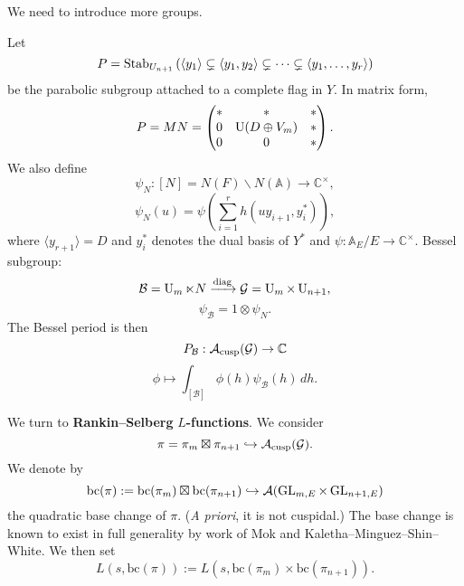 \documentclass[reqno]{amsart} 
\begin{document}
We need to introduce more groups.

Let
\begin{equation*}
  P = \operatorname{Stab}_{U_{n+1} } \left( \langle y_1  \rangle \subsetneq \langle y_1, y_2  \rangle \subsetneq \dotsb \subsetneq \langle y_{1}, \dotsc, y_r  \rangle  \right)
\end{equation*}
be the parabolic subgroup attached to a complete flag in $Y$.  In matrix form,
\begin{equation*}
  P = M N
  =
\begin{pmatrix}
\ast & \ast & \ast \\
0 & \operatorname{U} (D \oplus V_m ) & \ast \\
0 & 0 & \ast \\
\end{pmatrix}.
\end{equation*}
We also define
\begin{equation*}
\psi_N : [N] = N(F) \backslash N (\mathbb{A} ) \rightarrow \mathbb{C}^\times ,
\end{equation*}
\begin{equation*}
\psi_N (u) = \psi \left( \sum_{i = 1}^r h (u y_{i + 1}, y_i^\ast) \right),
\end{equation*}
where $\langle y_{r + 1} \rangle = D$ and $y_i^\ast$ denotes the dual basis of $Y^\ast$ and $\psi : \mathbb{A}_E / E \rightarrow \mathbb{C}^\times$.  Bessel subgroup:
\begin{equation*}
\mathcal{B} = \operatorname{U}_m \ltimes N \xrightarrow{\mathrm{diag}} \mathcal{G} = \operatorname{U}_m \times \operatorname{U}_{n + 1},
\end{equation*}
\begin{equation*}
\psi_{\mathcal{B} } = 1 \otimes \psi_N.
\end{equation*}
The Bessel period is then
\begin{equation*}
P_{\mathcal{B} } : \mathcal{A}_{\operatorname{cusp}} (\mathcal{G} ) \rightarrow \mathbb{C}
\end{equation*}
\begin{equation*}
\phi \mapsto \int_{[\mathcal{B} ]} \phi (h) \psi_{\mathcal{B} } (h) \, d h.
\end{equation*}

We turn to \textbf{Rankin--Selberg} $L$\textbf{-functions}.  We consider
\begin{equation*}
\pi = \pi_m \boxtimes \pi_{n + 1} \hookrightarrow \mathcal{A}_{\operatorname{cusp}} (\mathcal{G} ).
\end{equation*}
We denote by
\begin{equation*}
  \mathrm{bc}(\pi ) := \mathrm{bc} (\pi_m ) \boxtimes \mathrm{bc} (\pi_{n + 1})
  \hookrightarrow \mathcal{A} (\operatorname{GL}_{m, E} \times \operatorname{GL}_{n + 1, E})
\end{equation*}
the quadratic base change of $\pi$.  (\emph{A priori}, it is not cuspidal.)  The base change is known to exist in full generality by work of Mok and Kaletha--Minguez--Shin--White.  We then set
\begin{equation*}
L (s, \mathrm{bc} (\pi) ) := L (s, \mathrm{bc} (\pi_m ) \times \mathrm{bc} (\pi_{n + 1})).
\end{equation*}
\end{document}
